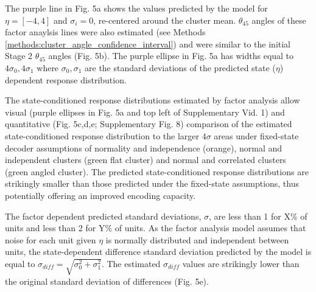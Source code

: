 \documentclass{article}
\begin{document}
The purple line in Fig. 5a shows the values predicted by the model for $\eta = [-4, 4]$ and $\sigma_i = 0$, re-centered around the cluster mean. $\theta_{45}$ angles of these factor anaylsis lines were also estimated 
(see Methods \ref{methods:cluster_angle_confidence_interval}) and were similar to the initial Stage 2 $\theta_{45}$ angles (Fig. 5b). The purple ellipse in Fig. 5a has widths equal to $4\sigma_0, 4\sigma_1$ where  $\sigma_0, \sigma_1$ are the standard deviations of the predicted state ($\eta$) dependent response distribution. 

The state-conditioned response distributions estimated by factor analysis allow visual (purple ellipses in Fig. 5a and top left of Supplementary Vid. 1) and quantitative (Fig. 5c,d,e; Supplementary Fig. 8) comparison of the estimated state-conditioned response distribution to the larger $4\sigma$ areas under fixed-state decoder assumptions of normality and independence (orange), normal and independent clusters (green flat cluster) and normal and correlated clusters (green angled cluster). The predicted state-conditioned response distributions are strikingly smaller than those predicted under the fixed-state assumptions, thus potentially offering an improved encoding capacity. 

The factor dependent predicted standard deviations, $\sigma$, are less than 1 for X\% of units and less than 2 for Y\% of units. 
As the factor analysis model assumes that noise for each unit given $\eta$ is normally distributed and independent between units, the state-dependent difference standard deviation predicted by the model is equal to \(\sigma_{diff} = \sqrt{\sigma_{0}^2 + \sigma_{1}^2}\). The estimated $\sigma_{diff}$ values are strikingly lower than the original standard deviation of differences (Fig. 5e). 

\end{document}
